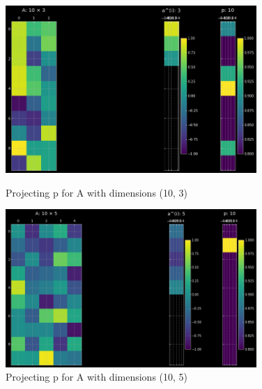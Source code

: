 \begin{figure}
    \centering
    \includegraphics[width=0.85\textwidth]{labs/05/images/dim3.png}
    \caption{Projecting p for A with dimensions (10, 3)}
    \label{fig:my_label1}
    \vspace{5mm}
    \includegraphics[width=0.85\textwidth]{labs/05/images/dim5.png}
    \caption{Projecting p for A with dimensions (10, 5)}
    \label{fig:my_label2}
\end{figure}